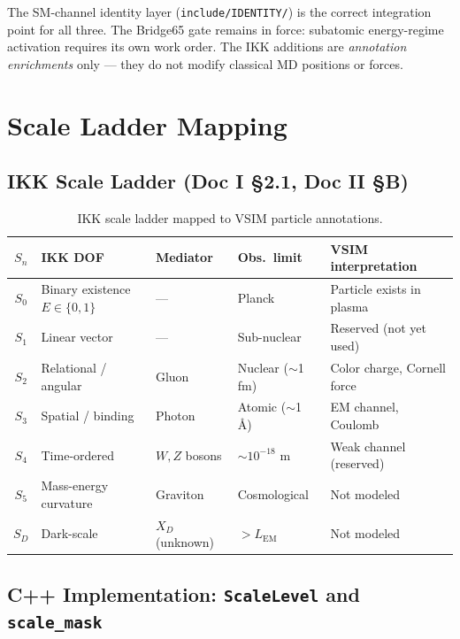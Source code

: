 \documentclass[11pt, a4paper, oneside]{article}
\theoremstyle{definition}
\theoremstyle{remark}
\begin{document}
The SM-channel identity layer (\texttt{include/IDENTITY/}) is the correct
integration point for all three.  The Bridge65 gate remains in force:
subatomic energy-regime activation requires its own work order.  The IKK
additions are \emph{annotation enrichments} only --- they do not modify
classical MD positions or forces.

\section{Scale Ladder Mapping}

\subsection{IKK Scale Ladder (Doc I \S2.1, Doc II \S B)}

\begin{table}[h]
  \centering
  \begin{tabularx}{\linewidth}{c l l l l}
	\toprule
	$S_n$ & IKK DOF & Mediator & Obs.\ limit & VSIM interpretation \\
	\midrule
	$S_0$ & Binary existence $E\in\{0,1\}$ & --- & Planck & Particle exists in plasma \\
	$S_1$ & Linear vector & --- & Sub-nuclear & Reserved (not yet used) \\
	$S_2$ & Relational / angular & Gluon & Nuclear ($\sim$1 fm) & Color charge, Cornell force \\
	$S_3$ & Spatial / binding & Photon & Atomic ($\sim$1 \AA) & EM channel, Coulomb \\
	$S_4$ & Time-ordered & $W, Z$ bosons & $\sim10^{-18}$ m & Weak channel (reserved) \\
	$S_5$ & Mass-energy curvature & Graviton & Cosmological & Not modeled \\
	$S_D$ & Dark-scale & $X_D$ (unknown) & $> L_\text{EM}$ & Not modeled \\
	\bottomrule
  \end{tabularx}
  \caption{IKK scale ladder mapped to VSIM particle annotations.}
  \label{tab:scale-ladder}
\end{table}

\subsection{C++ Implementation: \texttt{ScaleLevel} and \texttt{scale\_mask}}
\end{document}
